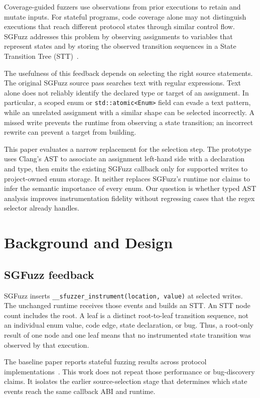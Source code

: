 \documentclass[conference]{IEEEtran}
\begin{document}
Coverage-guided fuzzers use observations from prior executions to retain and
mutate inputs. For stateful programs, code coverage alone may not distinguish
executions that reach different protocol states through similar control flow.
SGFuzz addresses this problem by observing assignments to variables that
represent states and by storing the observed transition sequences in a State
Transition Tree (STT)~\cite{ba2022}.

The usefulness of this feedback depends on selecting the right source
statements. The original SGFuzz source pass searches text with regular
expressions. Text alone does not reliably identify the declared type or target
of an assignment. In particular, a scoped enum or \texttt{std::atomic<Enum>}
field can evade a text pattern, while an unrelated assignment with a similar
shape can be selected incorrectly. A missed write prevents the runtime from
observing a state transition; an incorrect rewrite can prevent a target from
building.

This paper evaluates a narrow replacement for the selection step. The prototype
uses Clang's AST to associate an assignment left-hand side with a declaration
and type, then emits the existing SGFuzz callback only for supported writes to
project-owned enum storage. It neither replaces SGFuzz's runtime nor claims to
infer the semantic importance of every enum. Our question is whether typed AST
analysis improves instrumentation fidelity without regressing cases that the
regex selector already handles.

\section{Background and Design}

\subsection{SGFuzz feedback}

SGFuzz inserts \texttt{\_\_sfuzzer\_instrument(location, value)} at selected
writes. The unchanged runtime receives those events and builds an STT. An STT
node count includes the root. A leaf is a distinct root-to-leaf transition
sequence, not an individual enum value, code edge, state declaration, or bug.
Thus, a root-only result of one node and one leaf means that no instrumented
state transition was observed by that execution.

The baseline paper reports stateful fuzzing results across protocol
implementations~\cite{ba2022}. This work does not repeat those performance or
bug-discovery claims. It isolates the earlier source-selection stage that
determines which state events reach the same callback ABI and runtime.
\end{document}
